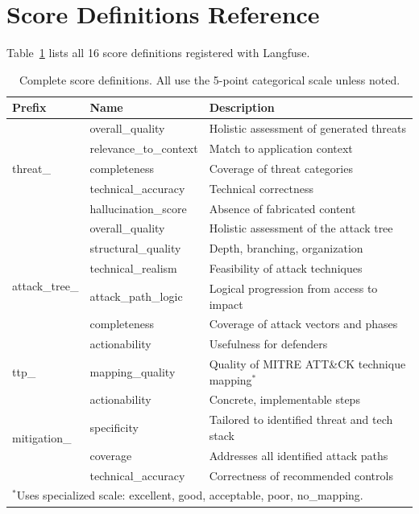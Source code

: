 
\section{Score Definitions Reference}
\label{app:scores}

Table~\ref{tab:all-scores} lists all 16 score definitions registered with Langfuse.

\begin{table}[h]
\centering
\small
\caption{Complete score definitions. All use the 5-point categorical scale unless noted.}
\label{tab:all-scores}
\begin{tabular}{llp{7cm}}
\toprule
\textbf{Prefix} & \textbf{Name} & \textbf{Description} \\
\midrule
\multirow{5}{*}{threat\_} & overall\_quality & Holistic assessment of generated threats \\
& relevance\_to\_context & Match to application context \\
& completeness & Coverage of threat categories \\
& technical\_accuracy & Technical correctness \\
& hallucination\_score & Absence of fabricated content \\
\midrule
\multirow{6}{*}{attack\_tree\_} & overall\_quality & Holistic assessment of the attack tree \\
& structural\_quality & Depth, branching, organization \\
& technical\_realism & Feasibility of attack techniques \\
& attack\_path\_logic & Logical progression from access to impact \\
& completeness & Coverage of attack vectors and phases \\
& actionability & Usefulness for defenders \\
\midrule
ttp\_ & mapping\_quality & Quality of MITRE ATT\&CK technique mapping$^*$ \\
\midrule
\multirow{4}{*}{mitigation\_} & actionability & Concrete, implementable steps \\
& specificity & Tailored to identified threat and tech stack \\
& coverage & Addresses all identified attack paths \\
& technical\_accuracy & Correctness of recommended controls \\
\bottomrule
\multicolumn{3}{l}{\footnotesize $^*$Uses specialized scale: excellent, good, acceptable, poor, no\_mapping.}
\end{tabular}
\end{table}

